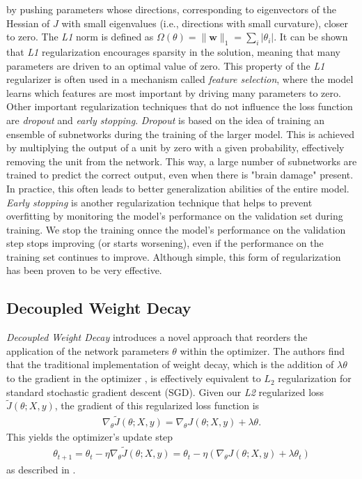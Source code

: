 by pushing parameters whose directions, corresponding to eigenvectors of the Hessian of $J$ with small
eigenvalues (i.e., directions with small curvature), closer to zero.
The \emph{L1} norm is defined as  \(\Omega(\theta) = \|\mathbf{w}\|_1 = \sum_i |\theta_i|\).
It can be shown that \emph{L1} regularization encourages sparsity in the solution, meaning that many parameters are driven to an optimal value of zero.
This property of the \emph{L1} regularizer is often used in a mechanism called \emph{feature selection},
where the model learns which features are most important by driving many parameters to zero. 
Other important regularization techniques that do not influence the loss function are \emph{dropout}
and \emph{early stopping}. \emph{Dropout} is based on the idea of training an ensemble of subnetworks
during the training of the larger model. This is achieved by multiplying the output of a unit 
by zero with a given probability, effectively removing the unit from the network.
This way, a large number of subnetworks are trained to predict the correct output, even when there
is "brain damage" present. In practice, this often leads to better generalization abilities of the
entire model. \emph{Early stopping} is another regularization technique that helps to prevent overfitting
by monitoring the model's performance on the validation set during training. We stop the training onnce
the model's performance on the validation step stops improving (or starts worsening), even if the performance
on the training set continues to improve. Although simple, this form of regularization has been proven to be very effective.
\cite{Goodfellow-et-al-2016}

\subsection{Decoupled Weight Decay}
\label{sec:dcp_weightdecay}

\emph{Decoupled Weight Decay} \cite{Loshchilov2017FixingWD} introduces a novel approach that reorders the application of the network parameters $\theta$ within the optimizer.
The authors find that the traditional implementation of weight decay, which is the addition of $\lambda \theta$ to the gradient in the optimizer \cite{Loshchilov2017FixingWD},
is effectively equivalent to $L_2$ regularization
for standard stochastic gradient descent (SGD). Given our \emph{L2} regularized loss $\tilde{J}(\theta; X, y)$,
the gradient of this regularized loss function is
\begin{align}
\nabla_{\theta} \tilde{J}(\theta; X, y) = \nabla_{\theta} J(\theta; X, y) + \lambda \theta.
\end{align}
This yields the optimizer's update step
\begin{align}
\theta_{t+1} = \theta_t - \eta \nabla_{\theta} \tilde{J}(\theta; X, y) = \theta_t - \eta (\nabla_{\theta} J(\theta; X, y) + \lambda \theta_t)
\end{align}
\noindent as described in \cite{DecoupledWeightDecay}.

